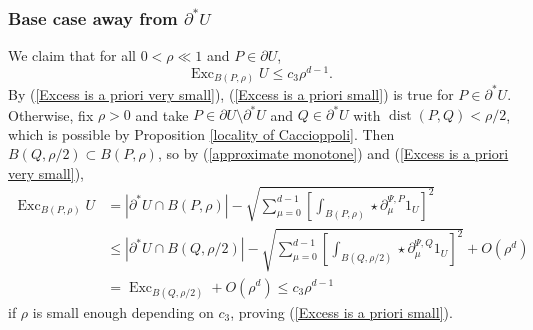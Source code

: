 \documentclass[reqno,10pt]{amsart}
\DeclareMathOperator{\Exc}{Exc}
\DeclareMathOperator{\dist}{dist}
\theoremstyle{definition}
\numberwithin{equation}{section}
\begin{document}
\subsubsection{Base case away from \texorpdfstring{$\partial^* U$}{the reduced boundary}}
We claim that for all $0 < \rho \ll 1$ and $P \in \partial U$,
\begin{equation}\label{Excess is a priori small}
\Exc_{B(P, \rho)} U \leq c_3 \rho^{d - 1}.
\end{equation}
By (\ref{Excess is a priori very small}), (\ref{Excess is a priori small}) is true for $P \in \partial^* U$.
Otherwise, fix $\rho > 0$ and take $P \in \partial U \setminus \partial^* U$ and $Q \in \partial^* U$ with $\dist(P, Q) < \rho/2$, which is possible by Proposition \ref{locality of Caccioppoli}.
Then $B(Q, \rho/2) \subset B(P, \rho)$, so by (\ref{approximate monotone}) and (\ref{Excess is a priori very small}),
\begin{align*}
\Exc_{B(P, \rho)} U &= |\partial^* U \cap B(P, \rho)| - \sqrt{\sum_{\mu = 0}^{d - 1} \left[\int_{B(P, \rho)} \star \partial_\mu^{\Psi, P} 1_U\right]^2} \\
&\leq |\partial^* U \cap B(Q, \rho/2)| - \sqrt{\sum_{\mu = 0}^{d - 1} \left[\int_{B(Q, \rho/2)} \star \partial_\mu^{\Psi, Q} 1_U\right]^2} + O(\rho^d) \\
&= \Exc_{B(Q, \rho/2)} + O(\rho^d) \leq c_3 \rho^{d - 1}
\end{align*}
if $\rho$ is small enough depending on $c_3$, proving (\ref{Excess is a priori small}).
\end{document}
